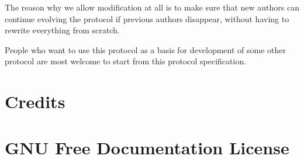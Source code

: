 \documentclass[a4paper]{article}
\begin{document}
The reason why we allow modification at all is to make sure that new
authors can continue evolving the protocol if previous authors
disappear, without having to rewrite everything from scratch.

People who want to use this protocol as a basis for development of
some other protocol are most welcome to start from this protocol
specification.


\newpage
\section{Credits}


\newpage
\section{GNU Free Documentation License}
\label{sec:gfdl}


\end{document}

